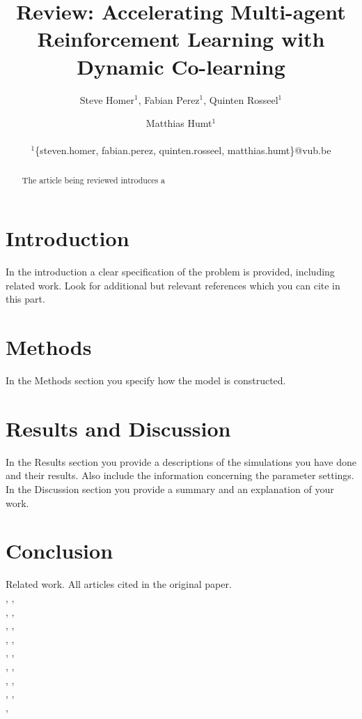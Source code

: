 \documentclass[letterpaper]{article}
\title{Review: Accelerating Multi-agent Reinforcement Learning
with Dynamic Co-learning}
\author{Steve Homer$^1$, Fabian Perez$^1$, Quinten Rosseel$^1$ \and Matthias Humt$^1$ \\
\mbox{}\\
$^1$\{steven.homer, fabian.perez, quinten.rosseel, matthias.humt\}@vub.be}
\begin{document}
\maketitle

\begin{abstract}
 The article being reviewed introduces a
\end{abstract}

\section{Introduction}
In the introduction a clear specification of the problem is provided, including related work. Look for additional but relevant references which you can cite in this part.\\[.5cm]
\blindtext

\section{Methods}
In the Methods section you specify how the model is constructed.\\[.5cm]
\blindtext

\section{Results and Discussion}
In the Results section you provide a descriptions of the simulations you have done and their results.  Also include the information concerning the parameter settings.\\
In the Discussion section you provide a summary and an explanation of your work.\\[.5cm]
\blindtext

\section{Conclusion}
Related work. All articles cited in the original paper.\\[.5cm]
\citep{carroll2005task}, \citep{garant2015accelerating},\\ \citep{ghavamzadeh2006hierarchical}, \citep{gmytrasiewicz2005framework},\\ \citep{guestrin2002multiagent}, \citep{kitano1999robocup},\\ \citep{lazaric2008transfer}, \citep{littman2001value},\\ \citep{nair2005networked}, \citep{nedic2009distributed},\\ \citep{oliehoek2008exploiting}, \citep{price2003accelerating},\\ \citep{renyi1961measures}, \citep{taylor2009transfer},\\ \citep{vickrey2002multi}, \citep{witwicki2010influence},\\ \citep{zhang2010self}, \citep{zhang2013coordinating}
\end{document}

